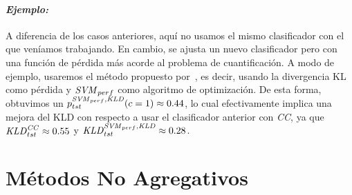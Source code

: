 \paragraph{\it Ejemplo:\/} A diferencia de los casos anteriores, aquí no usamos
el mismo clasificador con el que veníamos trabajando. En cambio, se ajusta un
nuevo clasificador pero con una función de pérdida más acorde al problema de
cuantificación. A modo de ejemplo, usaremos el método propuesto
por~\citet{esuli2010sentiment}, es decir, usando la divergencia KL como pérdida
y ${\it SVM \/}_{perf}$ como algoritmo de optimización. De esta forma, obtuvimos
un $p^{{\it SVM \/}_{perf}, {\it KLD \/}}_{tst}(c=1) \approx 0.44$, lo cual
efectivamente implica una mejora del KLD con respecto a usar el clasificador
anterior con {\it CC}, ya que ${\it KLD \/}^{\it CC\/}_{tst} \approx 0.55$ y
${\it KLD \/}^{{\it SVM \/}_{perf}, {\it KLD \/}}_{tst} \approx 0.28$.

\section{Métodos No Agregativos}\label{puntual:no_agregativos}
